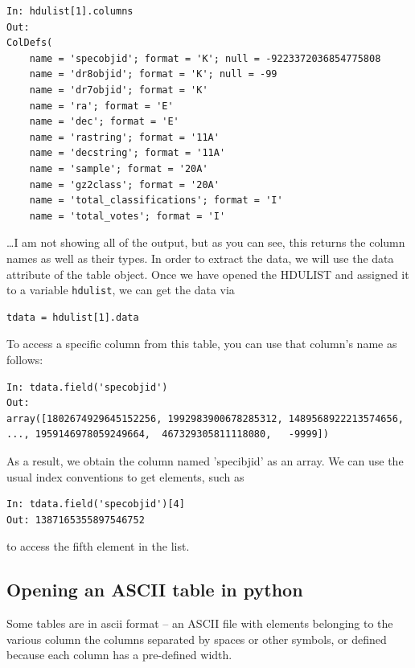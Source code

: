 \documentclass[twocolumn,apj]{openjournal}
\begin{document}
\begin{lstlisting}
In: hdulist[1].columns
Out:
ColDefs(
    name = 'specobjid'; format = 'K'; null = -9223372036854775808
    name = 'dr8objid'; format = 'K'; null = -99
    name = 'dr7objid'; format = 'K'
    name = 'ra'; format = 'E'
    name = 'dec'; format = 'E'
    name = 'rastring'; format = '11A'
    name = 'decstring'; format = '11A'
    name = 'sample'; format = '20A'
    name = 'gz2class'; format = '20A'
    name = 'total_classifications'; format = 'I'
    name = 'total_votes'; format = 'I'
\end{lstlisting}
\dots I am not showing all of the output, but as you can see, this returns the column names as well as their types.  In order to extract the data, we will use the data attribute of the table object. Once we have opened the HDULIST and assigned it to a variable \verb|hdulist|, we can get the data via
\begin{lstlisting}
tdata = hdulist[1].data
\end{lstlisting}
To access a specific column from this table, you can use that column's name as follows:
\begin{lstlisting}
In: tdata.field('specobjid')
Out: 
array([1802674929645152256, 1992983900678285312, 1489568922213574656, 
..., 1959146978059249664,  467329305811118080,   -9999])
\end{lstlisting}
As a result, we obtain the column named 'specibjid' as an array. We can use the usual index conventions to get elements, such as
\begin{lstlisting}
In: tdata.field('specobjid')[4]
Out: 1387165355897546752
\end{lstlisting}
to access the fifth element in the list.

\subsection{Opening an ASCII table in python}
Some tables are in ascii format -- an ASCII file with elements belonging to the various column the columns separated by spaces or other symbols, or defined because each column has a pre-defined width.
\end{document}
